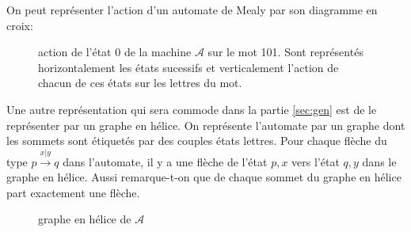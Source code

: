\documentclass[11pt,a4paper]{article}
\begin{document}
On peut représenter l'action d'un automate de Mealy par son diagramme en croix:

\begin{figure}[!ht]
  \begin{center}
    \caption{action de l'état 0 de la machine $\mathcal{A}$ sur le mot 101. Sont représentés horizontalement les états sucessifs et verticalement l'action de chacun de ces états sur les lettres du mot.}
  \end{center}
\end{figure}

Une autre représentation qui sera commode dans la partie \ref{sec:gen} est de le représenter par un graphe en hélice. On représente l'automate par un graphe dont les sommets sont étiquetés par des couples états lettres. Pour chaque flèche du type $p\overset{x|y}{\longrightarrow}q$ dans l'automate, il y a une flèche de l'état $p, x$ vers l'état $q, y$ dans le graphe en hélice. Aussi remarque-t-on que de chaque sommet du graphe en hélice part exactement une flèche.

\begin{figure}[!ht]
  \begin{center}
    \caption{graphe en hélice de $\mathcal{A}$}
  \end{center}
\end{figure}
\end{document}
